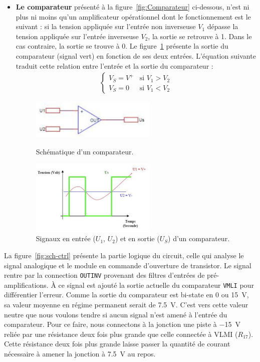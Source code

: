 \documentclass[10pt, oneside, a4paper]{article}
\begin{document}
\begin{itemize}
\item \noindent\textbf{Le comparateur} présenté à la figure~\ref{fig:Comparateur} ci-dessous, n'est ni plus ni moins qu'un amplificateur opérationnel dont le fonctionnement est le suivant : si la tension appliquée sur l'entrée non inverseuse $V_{1}$ dépasse la tension appliquée sur l'entrée inverseuse $V_{2}$, la sortie se retrouve à 1.
Dans le cas contraire, la sortie se trouve à 0.
Le figure~\ref{fig:Comparateur_Graphe} présente la sortie du comparateur (signal vert) en fonction de ses deux entrées.
L'équation suivante traduit cette relation entre l'entrée et la sortie du comparateur : 
\begin{align}
\begin{cases}
 V_{S} = V^{+} &\text{si } V_{1} > V_{2} \\
 V_{S} = 0     &\text{si } V_{1} < V_{2}
\end{cases}
\end{align}
\begin{figure}[!ht]
    \centering
    \includegraphics[width=6cm]{image/comparateur.png}
    \caption{Schématique d'un comparateur.}
    \label{fig:Comparateur}
    \centering
    \includegraphics[width=6cm]{image/Graphe_Comparateur.png}
    \caption{Signaux en entrée ($U_1$, $U_2$) et en sortie ($U_S$) d'un comparateur.}
    \label{fig:Comparateur_Graphe}
\end{figure}
\end{itemize}
La figure~\ref{fig:sch-ctrl} présente la partie logique du circuit, celle qui analyse le signal analogique et le module en commande d'ouverture de transistor.
Le signal rentre par la connection \texttt{OUTINV} provenant des filtres d'entrées de pré-amplifications.
À ce signal est ajouté la sortie actuelle du comparateur \texttt{VMLI} pour différentier l'erreur.
Comme la sortie du comparateur est bi-state en 0 ou \SI{15}{\volt}, sa valeur moyenne en régime permanent serait de \SI{7.5}{\volt}.
C'est vers cette valeur \og{}neutre\fg{} que nous voulons tendre si aucun signal n'est amené à l'entrée du comparateur.
Pour ce faire, nous connectons à la jonction une piste à \SI{-15}{\volt} reliée par une résistance deux fois plus grande que celle connectée à VLMI ($R_{17}$).
Cette résistance deux fois plus grande laisse passer la quantité de courant nécessaire à amener la jonction à \SI{7.5}{\volt} au repos.
\end{document}
